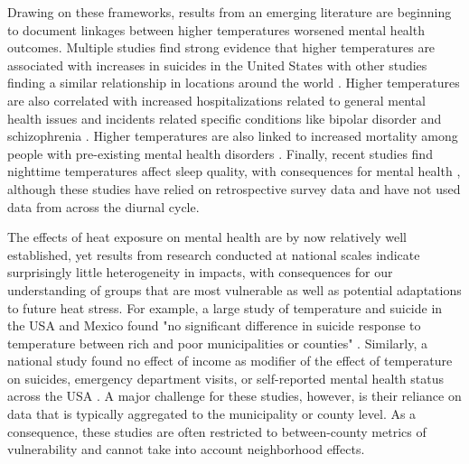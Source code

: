\documentclass[fleqn,10pt]{wlscirep}
\begin{document}
Drawing on these frameworks, results from an emerging literature are beginning to document linkages between higher temperatures worsened mental health outcomes. Multiple studies find strong evidence that higher temperatures are associated with increases in suicides in the United States \cite{Burke2018Aug, Mullins2019Dec, Dixon2007May} with other studies finding a similar relationship in locations around the world \cite{Qi2014Dec, Page2007Aug, Likhvar2011Jan}. Higher temperatures are also correlated with increased hospitalizations related to general mental health issues \cite{Obradovich2018Oct, Mullins2019Dec} and incidents related specific conditions like bipolar disorder and schizophrenia \cite{Lee2007Jan, Sung2013Feb}. Higher temperatures are also linked to increased mortality among people with pre-existing mental health disorders \cite{Hansen2008Oct}.  Finally, recent studies find nighttime temperatures affect sleep quality, with consequences for mental health \cite{Obradovich2017May, Mullins2019Dec}, although these studies have relied on retrospective survey data and have not used data from across the diurnal cycle. 

The effects of heat exposure on mental health are by now relatively well established, yet results from research conducted at national scales indicate surprisingly little heterogeneity in impacts, with consequences for our understanding of groups that are most vulnerable as well as potential adaptations to future heat stress. For example, a large study of temperature and suicide in the USA and Mexico found "no significant difference in suicide response to temperature between rich and poor municipalities or counties" \cite{Burke2018Aug}. Similarly, a national study found no effect of income as modifier of the effect of temperature on suicides, emergency department visits, or self-reported mental health status across the USA \cite{Mullins2019Dec}. A major challenge for these studies, however, is their reliance on data that is typically aggregated to the municipality or county level. As a consequence, these studies are often restricted to between-county metrics of vulnerability and cannot take into account neighborhood effects.
\end{document}
